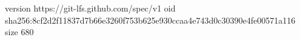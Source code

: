 version https://git-lfs.github.com/spec/v1
oid sha256:8cf2d2f11837d7b66e3260f753b625e930ccaa4e743d0c30390e4fe00571a116
size 680
